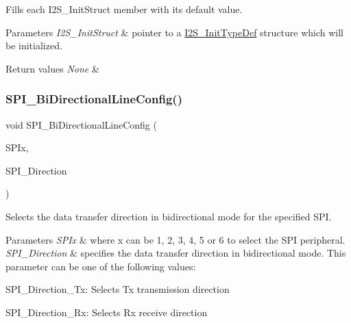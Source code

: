Fills each I2\+S\+\_\+\+Init\+Struct member with its default value. 


\begin{DoxyParams}{Parameters}
{\em I2\+S\+\_\+\+Init\+Struct} & pointer to a \mbox{\hyperlink{struct_i2_s___init_type_def}{I2\+S\+\_\+\+Init\+Type\+Def}} structure which will be initialized. \\
\hline
\end{DoxyParams}

\begin{DoxyRetVals}{Return values}
{\em None} & \\
\hline
\end{DoxyRetVals}
\mbox{\label{group___s_p_i___group1_ga166171c421fc51da7714723524d41b45}} 
\subsubsection{\texorpdfstring{S\+P\+I\+\_\+\+Bi\+Directional\+Line\+Config()}{SPI\_BiDirectionalLineConfig()}}
{\footnotesize\ttfamily void S\+P\+I\+\_\+\+Bi\+Directional\+Line\+Config (\begin{DoxyParamCaption}\item[{S\+P\+I\+\_\+\+Type\+Def $\ast$}]{S\+P\+Ix,  }\item[{uint16\+\_\+t}]{S\+P\+I\+\_\+\+Direction }\end{DoxyParamCaption})}



Selects the data transfer direction in bidirectional mode for the specified S\+PI. 


\begin{DoxyParams}{Parameters}
{\em S\+P\+Ix} & where x can be 1, 2, 3, 4, 5 or 6 to select the S\+PI peripheral. \\
\hline
{\em S\+P\+I\+\_\+\+Direction} & specifies the data transfer direction in bidirectional mode. This parameter can be one of the following values\+: \begin{DoxyItemize}
\item S\+P\+I\+\_\+\+Direction\+\_\+\+Tx\+: Selects Tx transmission direction \item S\+P\+I\+\_\+\+Direction\+\_\+\+Rx\+: Selects Rx receive direction \end{DoxyItemize}
\\
\hline
\end{DoxyParams}

